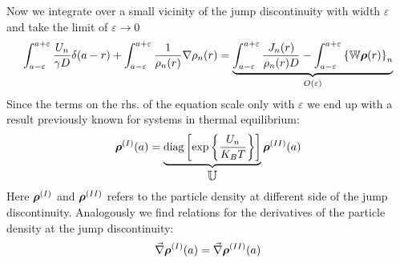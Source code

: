 Now we integrate over a small vicinity of the jump discontinuity with width $\varepsilon$ and take the limit of $\varepsilon \rightarrow 0$
    \begin{equation}
        \int_{a-\varepsilon}^{a + \varepsilon} \frac{U_n}{\gamma D}\delta(a-r) + \int_{a-\varepsilon}^{a + \varepsilon} \frac{1}{\rho_n(r)}\nabla \rho_n(r) = \underbrace{\int_{a - \varepsilon}^{a + \varepsilon}\frac{J_n(r)}{\rho_n(r) D} - \int_{a - \varepsilon} ^{a+ \varepsilon} \left\{ \mathbb{W} \boldsymbol{\mathbf{\rho}}(r)\right\}_{n}}_\text{$O(\varepsilon)$}
    \end{equation}
Since the terms on the rhs. of the equation scale only with $\varepsilon$ we end up with a result previously known for systems in thermal equilibrium:
\begin{equation}
    \boldsymbol{\mathbf{\rho}}^{(I)}(a) = \underbrace{ {\rm diag}\left[\exp\left\{\frac{U_n}{K_B T} \right\}\right]}_\text{\large$\mathbb{U}$} \boldsymbol{\mathbf{\rho}}^{(II)}(a)
    \label{dens_fit}
\end{equation}
Here $\boldsymbol{\mathbf{\rho}}^{(I)}$ and $\boldsymbol{\mathbf{\rho}}^{(II)}$ refers to the particle density at different side of the jump discontinuity.
Analogously we find relations for the derivatives of the particle density at the jump discontinuity:
\begin{equation}
    \vec{\nabla}\boldsymbol{\mathbf{\rho}}^{(I)}(a) = \vec{\nabla}\boldsymbol{\mathbf{\rho}}^{(II)}(a)
    \label{ddens_fit}
\end{equation}
